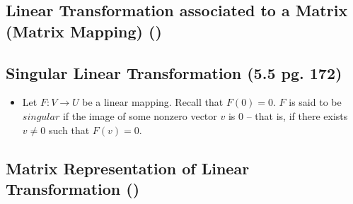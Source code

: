 \documentclass[hidelinks, 11pt, openleft]{scrartcl}
\begin{document}
\subsection*{Linear Transformation associated to a Matrix (Matrix Mapping) () }
\vspace{10 cm}

\subsection*{Singular Linear Transformation (5.5 pg. 172)}
\begin{itemize}
    \item Let $F: V \to U$ be a linear mapping. Recall that $F(0) = 0$. $F$ is said to be $singular$ if the image of some nonzero vector $v$ is 0 -- that is, if there exists $v \ne 0$ such that $F(v) = 0$.
\end{itemize}

\subsection*{Matrix Representation of Linear Transformation ()}
\vspace{10 cm}
\end{document}
